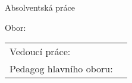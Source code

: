 
\pagestyle{empty}

\begin{center}

	\begin{Large}
		\noindent
		{\textbf{\MakeUppercase{\skola}}}
	\end{Large}

	\vfill

	\begin{Large}
		\noindent
		Absolventská práce
	\end{Large}

	\begin{spacing}{1.8}
		\begin{huge}
			\noindent
			\textbf{\MakeUppercase{\appTema}}
		\end{huge}
	\end{spacing}

	\vfill

	\begin{Large}
		\noindent
		\textbf{\autor}
	\end{Large}


	\begin{large}
		\noindent
		Obor: {\studijniObor}

		\noindent
		{\studijniProgram}
	\end{large}

\end{center}

\vfill

\begin{large}
	\begin{tabularx}{\textwidth}{ l X }
		Vedoucí práce:	& {\appVedouci} \\
		Pedagog hlavního oboru:	& {\appUcitel} \\
	\end{tabularx}
\end{large}

\vfill

\begin{center}
	\begin{large}
		\noindent
		\textbf{\MakeUppercase{\misto}}

		\noindent
		\textbf{\MakeUppercase{\skolniRok}}
	\end{large}
\end{center}

\newpage
